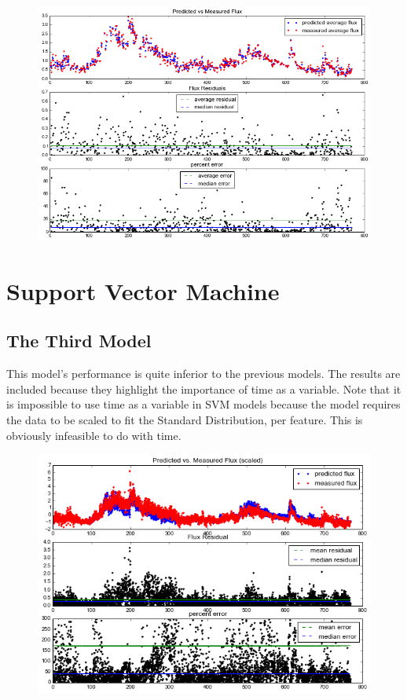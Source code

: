 \documentclass{article}
\begin{document}
\begin{figure}[H]
	\includegraphics[width=\textwidth, height=\textheight, keepaspectratio]{rf2_small.png}
\end{figure}

\section{Support Vector Machine}

\subsection{The Third Model}

This model's performance is quite inferior to the previous models. The results are included because they highlight the importance of time as a variable. Note that it is impossible to use time as a variable in SVM models because the model requires the data to be scaled to fit the Standard Distribution, per feature. This is obviously infeasible to do with time.

\begin{figure}[H]
	\includegraphics[width=\textwidth, height=\textheight, keepaspectratio]{svm1.png}
\end{figure}
\end{document}
